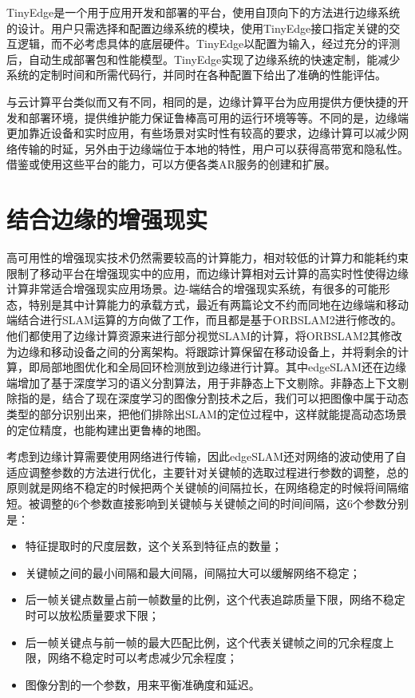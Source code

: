 TinyEdge\cite{ZhaZhaFan20}是一个用于应用开发和部署的平台，使用自顶向下的方法进行边缘系统的设计。用户只需选择和配置边缘系统的模块，使用TinyEdge接口指定关键的交互逻辑，而不必考虑具体的底层硬件。TinyEdge以配置为输入，经过充分的评测后，自动生成部署包和性能模型。TinyEdge实现了边缘系统的快速定制，能减少系统的定制时间和所需代码行，并同时在各种配置下给出了准确的性能评估。

与云计算平台类似而又有不同，相同的是，边缘计算平台为应用提供方便快捷的开发和部署环境，提供维护能力保证鲁棒高可用的运行环境等等。不同的是，边缘端更加靠近设备和实时应用，有些场景对实时性有较高的要求，边缘计算可以减少网络传输的时延，另外由于边缘端位于本地的特性，用户可以获得高带宽和隐私性。借鉴或使用这些平台的能力，可以方便各类AR服务的创建和扩展。

\section{结合边缘的增强现实}
高可用性的增强现实技术仍然需要较高的计算能力，相对较低的计算力和能耗约束限制了移动平台在增强现实中的应用，而边缘计算相对云计算的高实时性使得边缘计算非常适合增强现实应用场景。边-端结合的增强现实系统，有很多的可能形态，特别是其中计算能力的承载方式，最近有两篇论文不约而同地在边缘端和移动端结合进行SLAM运算的方向做了工作，而且都是基于ORBSLAM2进行修改的。他们都使用了边缘计算资源来进行部分视觉SLAM的计算，将ORBSLAM2其修改为边缘和移动设备之间的分离架构。将跟踪计算保留在移动设备上，并将剩余的计算，即局部地图优化和全局回环检测放到边缘进行计算。其中edgeSLAM\cite{ben2020edge}还在边缘端增加了基于深度学习的语义分割算法，用于非静态上下文剔除。非静态上下文剔除指的是，结合了现在深度学习的图像分割技术之后，我们可以把图像中属于动态类型的部分识别出来，把他们排除出SLAM的定位过程中，这样就能提高动态场景的定位精度，也能构建出更鲁棒的地图。

考虑到边缘计算需要使用网络进行传输，因此edgeSLAM还对网络的波动使用了自适应调整参数的方法进行优化，主要针对关键帧的选取过程进行参数的调整，总的原则就是网络不稳定的时候把两个关键帧的间隔拉长，在网络稳定的时候将间隔缩短。被调整的6个参数直接影响到关键帧与关键帧之间的时间间隔，这6个参数分别是：
\begin{itemize}
  \item 特征提取时的尺度层数，这个关系到特征点的数量；
  \item 关键帧之间的最小间隔和最大间隔，间隔拉大可以缓解网络不稳定；
  \item 后一帧关键点数量占前一帧数量的比例，这个代表追踪质量下限，网络不稳定时可以放松质量要求下限；
  \item 后一帧关键点与前一帧的最大匹配比例，这个代表关键帧之间的冗余程度上限，网络不稳定时可以考虑减少冗余程度；
  \item 图像分割的一个参数，用来平衡准确度和延迟。
\end{itemize}

